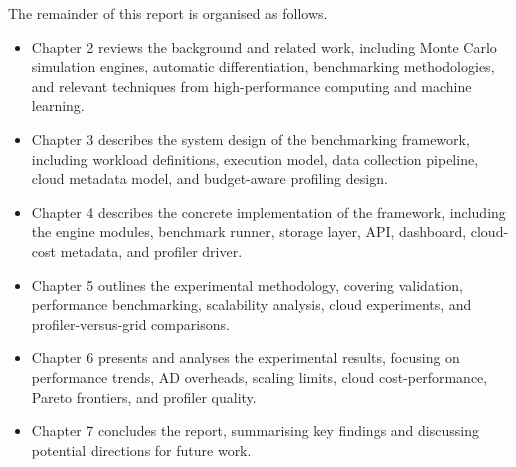 The remainder of this report is organised as follows.

\begin{itemize}
    
    \item Chapter 2 reviews the background and related work, including Monte Carlo simulation engines, automatic differentiation, benchmarking methodologies, and relevant techniques from high-performance computing and machine learning.
    
    \item Chapter 3 describes the system design of the benchmarking framework, including workload definitions, execution model, data collection pipeline, cloud metadata model, and budget-aware profiling design.
    
    \item Chapter 4 describes the concrete implementation of the framework, including the engine modules, benchmark runner, storage layer, API, dashboard, cloud-cost metadata, and profiler driver.
    
    \item Chapter 5 outlines the experimental methodology, covering validation, performance benchmarking, scalability analysis, cloud experiments, and profiler-versus-grid comparisons.
    
    \item Chapter 6 presents and analyses the experimental results, focusing on performance trends, AD overheads, scaling limits, cloud cost-performance, Pareto frontiers, and profiler quality.

    \item Chapter 7 concludes the report, summarising key findings and discussing potential directions for future work.
    
\end{itemize}
